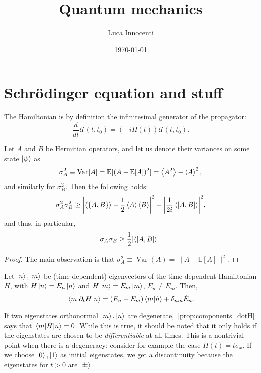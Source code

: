 \documentclass[a4paper]{report}
\date{\today}
\newcommand{\EE}{\mathbb{E}}
\DeclareMathOperator{\Var}{Var}
\begin{document}
\title{Quantum mechanics}
\author{Luca Innocenti}
\maketitle

\dominitoc
\tableofcontents

\chapter{Schr\"{o}dinger equation and stuff}

\begin{prop}
	The Hamiltonian is by definition the infinitesimal generator of the propagator:
	\begin{equation}
		\frac{d}{dt}\mathcal U(t,t_0) = (-iH(t))\mathcal U(t,t_0).
	\end{equation}
\end{prop}

\begin{thm}
	Let $A$ and $B$ be Hermitian operators, and let us denote their variances on some state $\ket\psi$ as
	\[ \sigma_A^2\equiv\Var[A]=\EE[(A-\EE[A])^2] = \expval{A^2}-\expval{A}^2, \]
	and similarly for $\sigma_B^2$.
	Then the following holds:
	\begin{equation}
		\sigma_A^2 \sigma_B^2 \ge
		\abs{\expval{\{A,B\}}-\frac{1}{2}\expval A\expval B}^2
		+ \abs{\frac{1}{2i} \expval{[A,B]}}^2,
	\end{equation}
	and thus, in particular,
	\begin{equation}
		\sigma_A\sigma_B\ge\frac{1}{2}\abs{\expval{[A,B]}}.
	\end{equation}
\end{thm}
\begin{proof}
	The main observation is that $\sigma_A^2\equiv\Var(A)=\|A-\EE[A]\|^2$.
\end{proof}

\begin{prop}
	Let $\ket n,\ket m$ be (time-dependent) eigenvectors of the time-dependent Hamiltonian $H$, with
	$H\ket n=E_n\ket n$ and $H\ket m=E_m\ket m$, $E_n\neq E_m$. Then,
	\[
		\mel{m}{\partial_t H}{n}=(E_n-E_m)\braket{m}{\dot n}
		+ \delta_{nm} \dot E_n.
	\]
	\label{prop:components_dotH}
\end{prop}

\begin{remark}
	If two eigenstates orthonormal $\ket m, \ket n$ are degenerate,~\cref{prop:components_dotH} says that $\mel{m}{\dot H}{n}=0$. While this is true, it should be noted that it only holds if the eigenstates are chosen to be \emph{differentiable} at all times. This is a nontrivial point when there is a degeneracy: consider for example the case $H(t)=t\sigma_x$. If we choose $\ket0, \ket1$ as initial eigenstates, we get a discontinuity because the eigenstates for $t>0$ are $\ket\pm$.
\end{remark}
\end{document}
